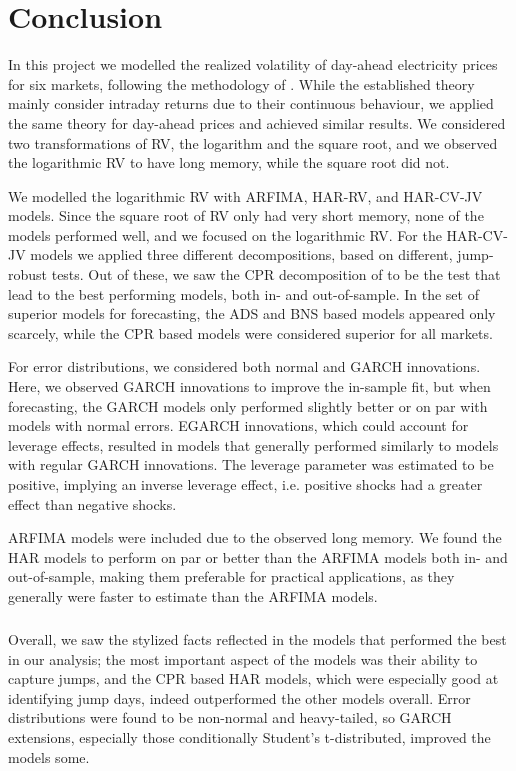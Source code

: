 \chapter{Conclusion}

In this project we modelled the realized volatility of day-ahead electricity prices for six markets, following the methodology of \citep{wiley17}.
While the established theory mainly consider intraday returns due to their continuous behaviour, we applied the same theory for day-ahead prices and achieved similar results.
We considered two transformations of RV, the logarithm and the square root, and we observed the logarithmic RV to have long memory, while the square root did not.

We modelled the logarithmic RV with ARFIMA, HAR-RV, and HAR-CV-JV models.
Since the square root of RV only had very short memory, none of the models performed well, and we focused on the logarithmic RV.
For the HAR-CV-JV models we applied three different decompositions, based on different, jump-robust tests.
Out of these, we saw the CPR decomposition of \citep{corsi} to be the test that lead to the best performing models, both in- and out-of-sample.
In the set of superior models for forecasting, the ADS and BNS based models appeared only scarcely, while the CPR based models were considered superior for all markets.

For error distributions, we considered both normal and GARCH innovations.
Here, we observed GARCH innovations to improve the in-sample fit, but when forecasting, the GARCH models only performed slightly better or on par with models with normal errors.
EGARCH innovations, which could account for leverage effects, resulted in models that generally performed similarly to models with regular GARCH innovations.
The leverage parameter was estimated to be positive, implying an inverse leverage effect, i.e. positive shocks had a greater effect than negative shocks.

ARFIMA models were included due to the observed long memory.
We found the HAR models to perform on par or better than the ARFIMA models both in- and out-of-sample, making them preferable for practical applications, as they generally were faster to estimate than the ARFIMA models.

\paragraph{}
Overall, we saw the stylized facts reflected in the models that performed the best in our analysis;
the most important aspect of the models was their ability to capture jumps, and the CPR based HAR models, which were especially good at identifying jump days, indeed outperformed the other models overall.
Error distributions were found to be non-normal and heavy-tailed, so GARCH extensions, especially those conditionally Student's t-distributed, improved the models some.

